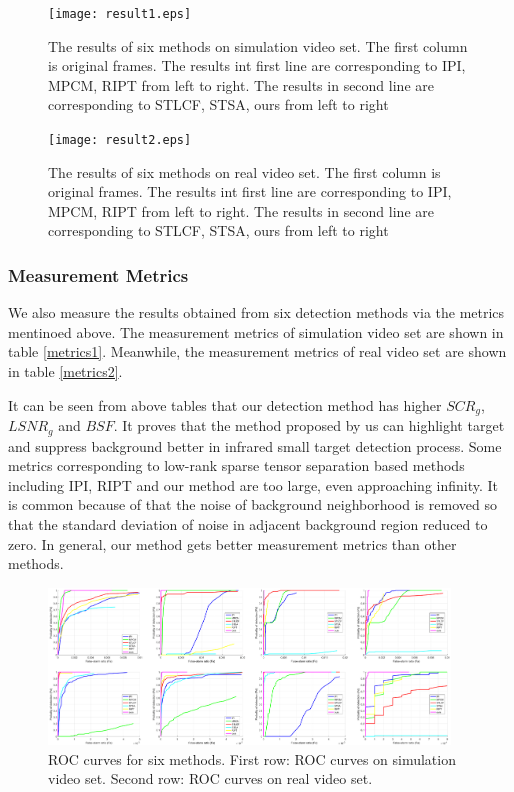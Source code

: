 \documentclass[journal]{IEEEtran}
\begin{document}
\newenvironment{figurehere}
{\def\@captype{figure}}
{}

\begin{figure}
  \centering
  \texttt{[image: result1.eps]}
  \caption{The results of six methods on simulation video set. The first column is original frames. The results int first line are corresponding to IPI, MPCM, RIPT from left to right. The results in second line are corresponding to STLCF, STSA, ours from left to right}
  \label{result1}
\end{figure}

\begin{figure}
  \centering
  \texttt{[image: result2.eps]}
  \caption{The results of six methods on real video set. The first column is original frames. The results int first line are corresponding to IPI, MPCM, RIPT from left to right. The results in second line are corresponding to STLCF, STSA, ours from left to right}
  \label{result2}
\end{figure}


\subsubsection{Measurement Metrics}
We also measure the results obtained from six detection methods via the metrics mentinoed above. The measurement metrics of simulation video set are shown in table \ref{metrics1}. Meanwhile, the measurement metrics of real video set are shown in table \ref{metrics2}.

It can be seen from above tables that our detection method has higher $SCR_g$, $LSNR_g$ and $BSF$. It proves that the method proposed by us can highlight target and suppress background better in infrared small target detection process. Some metrics corresponding to low-rank sparse tensor separation based methods including IPI, RIPT and our method are too large, even approaching infinity. It is common because of that the noise of background neighborhood is removed so that the standard deviation of noise in adjacent background region reduced to zero. In general, our method gets better measurement metrics than other methods.

\begin{figure}[htb]
  \centering
  \includegraphics[width=0.95\textwidth]{ROC.eps}
  \caption{ROC curves for six methods. First row: ROC curves on simulation video set. Second row: ROC curves on real video set.}
  \label{ROC}
\end{figure}
\end{document}
